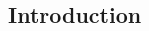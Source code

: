 \documentclass[a0,landscape]{a0poster}
\begin{document}
\vspace{1cm} %


\begin{multicols}{4} %


\color{Black} %









\section*{Introduction}


\end{multicols}
\end{document}
